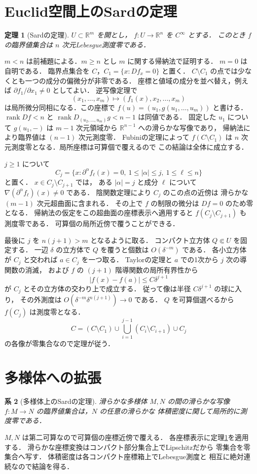 \documentclass[a5paper,10pt,onecolumn]{jsarticle}
\makeatletter
\theoremstyle{mathnotetheorem}
\newtheorem{theorem}{定理}[section]
\newtheorem{corollary}[theorem]{系}
\renewcommand{\proofname}{証明}
\renewenvironment{proof}[1][\proofname]{%
  \par\pushQED{\qed}\normalfont\topsep4\p@\@plus2\p@\relax
  \trivlist\item[\hskip\labelsep\bfseries #1]\ignorespaces
}{\popQED\endtrivlist\@endpefalse}
\makeatother
\begin{document}
\section{Euclid空間上のSardの定理}
\begin{theorem}[Sardの定理]\label{thm:sard}
$U\subset\mathbb R^m$ を開とし，
$f:U\to\mathbb R^n$ を $C^\infty$ とする．
このとき $f$ の臨界値集合は $n$ 次元Lebesgue測度零である．
\end{theorem}
\begin{proof}
$m<n$ は前補題による．$m\ge n$ とし
$m$ に関する帰納法で証明する．
$m=0$ は自明である．
臨界点集合を $C$，$C_1=\{x:Df_x=0\}$ と置く．
$C\setminus C_1$ の点では少なくとも一つの成分の偏微分が非零である．
座標と値域の成分を並べ替え，例えば
$\partial f_1/\partial x_1\ne0$ としてよい．
逆写像定理で
\[
 (x_1,\ldots,x_m)\longmapsto
 (f_1(x),x_2,\ldots,x_m)
\]
は局所微分同相になる．この座標で
$f(u)=(u_1,g(u_1,\ldots,u_m))$ と書ける．
$\operatorname{rank}Df<n$ と
$\operatorname{rank}D_{(u_2,\dots,u_m)}g<n-1$ は同値である．
固定した $u_1$ について $g(u_1,-)$ は
$m-1$ 次元領域から $\mathbb R^{n-1}$ への滑らかな写像であり，
帰納法により臨界値は $(n-1)$ 次元測度零．
Fubiniの定理によって $f(C\setminus C_1)$ は
$n$ 次元測度零となる．局所座標は可算個で覆えるので
この結論は全体に成立する．

$j\ge1$ について
\[
 C_j=\{x:\partial^\alpha f_\ell(x)=0,\
 1\le|\alpha|\le j,\ 1\le\ell\le n\}
\]
と置く．
$x\in C_j\setminus C_{j+1}$ では，
ある $|\alpha|=j$ と成分 $\ell$ について
$\nabla(\partial^\alpha f_\ell)(x)\ne0$ である．
陰関数定理により $C_j$ のこの点の近傍は
滑らかな $(m-1)$ 次元超曲面に含まれる．
その上で $f$ の制限の微分は
$Df=0$ のため零となる．
帰納法の仮定をこの超曲面の座標表示へ適用すると
$f(C_j\setminus C_{j+1})$ も測度零である．
可算個の局所近傍で覆うことができる．

最後に $j$ を $n(j+1)>m$ となるように取る．
コンパクト立方体 $Q\Subset U$ を固定する．
一辺 $\delta$ の立方体で $Q$ を覆うと個数は
$O(\delta^{-m})$ である．
各小立方体が $C_j$ と交われば $a\in C_j$ を一つ取る．
Taylorの定理と $a$ での1次から $j$ 次の導関数の消滅，
および $f$ の $(j+1)$ 階導関数の局所有界性から
\[
 |f(x)-f(a)|\le C\delta^{j+1}
\]
が $C_j$ とその立方体の交わり上で成立する．
従って像は半径 $C\delta^{j+1}$ の球に入り，
その外測度は
$O(\delta^{-m}\delta^{n(j+1)})\to0$ である．
$Q$ を可算個選べるから $f(C_j)$ は測度零となる．
\[
 C=(C\setminus C_1)\cup
 \bigcup_{i=1}^{j-1}(C_i\setminus C_{i+1})\cup C_j
\]
の各像が零集合なので定理が従う．
\end{proof}
\section{多様体への拡張}
\begin{corollary}[多様体上のSardの定理]
滑らかな多様体 $M,N$ の間の滑らかな写像
$f:M\to N$ の臨界値集合は，$N$ の任意の滑らかな
体積密度に関して局所的に測度零である．
\end{corollary}
\begin{proof}
$M,N$ は第二可算なので可算個の座標近傍で覆える．
各座標表示に定理\ref{thm:sard}を適用する．
滑らかな座標変換はコンパクト部分集合上でLipschitzだから
零集合を零集合へ写す．
体積密度は各コンパクト座標箱上でLebesgue測度と
相互に絶対連続なので結論を得る．
\end{proof}
\end{document}
